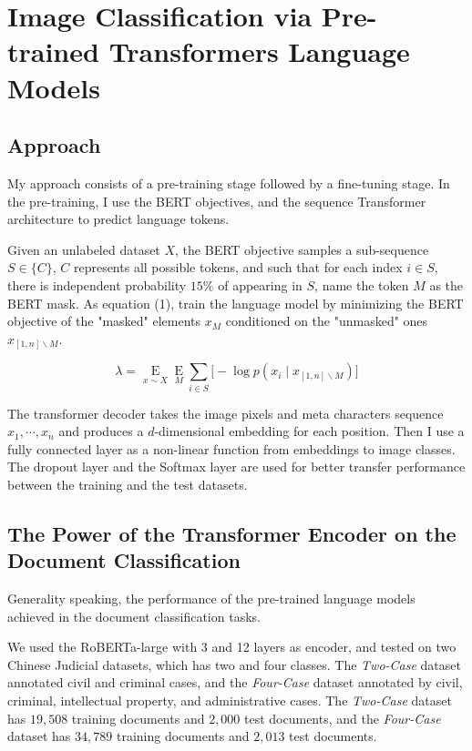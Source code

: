 \documentclass[runningheads]{llncs}
\begin{document}
\section{Image Classification via Pre-trained Transformers Language Models}

\subsection{Approach}

My approach consists of a pre-training stage followed by a fine-tuning stage.
In the pre-training, I use the BERT objectives, and the sequence Transformer architecture to predict language tokens.

\par Given an unlabeled dataset $ X$, the BERT objective samples a sub-sequence $ S \in \{C\}$,
$C$ represents all possible tokens, and such that for each index $i \in  S$,
there is independent probability $15\%$ of appearing in $ S$,
name the token $M$ as the BERT mask.
As equation (1), train the language model by minimizing the BERT objective of the "masked" elements $x_M$
conditioned on the "unmasked" ones $x_{\left[1,n\right]\backslash M}$.

\begin{equation}
  \lambda = \mathop{ E}\limits_{x\sim X} \mathop{ E}\limits_{M} \sum_{i\in S}{\bigl[-\log{p(x_i\mid x_{\left[1,n \right]\backslash M})\bigr]}}
\end{equation}

\par The transformer decoder takes the image pixels and meta characters sequence $x_1,\cdots,x_n$ and produces a $d$-dimensional
embedding for each position.
Then I use a fully connected layer as a non-linear function from embeddings to image classes.
The dropout layer and the Softmax layer are used for better transfer performance between the training and the test datasets.

\subsection{The Power of the Transformer Encoder on the Document Classification}

Generality speaking, the performance of the pre-trained language models achieved in the document classification tasks.

We used the RoBERTa-large with 3 and 12 layers as encoder, and tested on two Chinese Judicial datasets, which has two and four classes.
The \textit{Two-Case} dataset annotated civil and criminal cases, and the \textit{Four-Case} dataset annotated by civil, criminal, intellectual property, and administrative cases.
The \textit{Two-Case} dataset has $19,508$ training documents and $2,000$ test documents, and the \textit{Four-Case} dataset has $34,789$ training documents and $2,013$ test documents.
\end{document}
